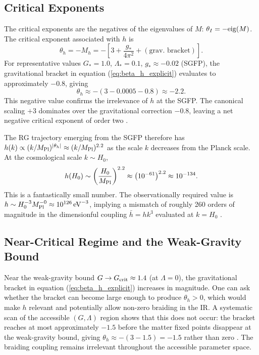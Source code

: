 \documentclass[12pt,a4paper]{article}
\begin{document}
\subsection{Critical Exponents}

The critical exponents are the negatives of the eigenvalues of $M$:
$\theta_I = -{\rm eig}(M)$. The critical exponent associated with $h$ is
\begin{equation}
\theta_h = -M_h = -\left[3 + \frac{g_*}{4\pi^2} + (\text{grav. bracket})\right].
\end{equation}
For representative values $G_* = 1.0$, $\Lambda_* = 0.1$, $g_* \approx -0.02$
(SGFP), the gravitational bracket in equation (\ref{eq:beta_h_explicit})
evaluates to approximately $-0.8$, giving
\begin{equation}
\theta_h \approx -(3 - 0.0005 - 0.8) \approx -2.2.
\end{equation}
This negative value confirms the irrelevance of $h$ at the SGFP. The canonical
scaling $+3$ dominates over the gravitational correction $-0.8$, leaving a net
negative critical exponent of order two \cite{EichhornLinoWagner2023}.

The RG trajectory emerging from the SGFP therefore has $h(k) \propto (k/M_{\rm Pl})^{|\theta_h|} \approx (k/M_{\rm Pl})^{2.2}$ as the scale $k$ decreases from the Planck scale. At the cosmological scale $k \sim H_0$,
\begin{equation}
h(H_0) \sim \left(\frac{H_0}{M_{\rm Pl}}\right)^{2.2}
\approx \left(10^{-61}\right)^{2.2}
\approx 10^{-134}.
\end{equation}
This is a fantastically small number. The observationally required value is
$h \sim H_0^{-3}M_{\rm Pl}^{-0} \approx 10^{126}\,{\rm eV}^{-3}$, implying a
mismatch of roughly 260 orders of magnitude in the dimensionful coupling
$\bar h = h k^3$ evaluated at $k = H_0$ \cite{EichhornLinoWagner2023}.

\subsection{Near-Critical Regime and the Weak-Gravity Bound}

Near the weak-gravity bound $G \to G_{\rm crit} \approx 1.4$ (at $\Lambda = 0$),
the gravitational bracket in equation (\ref{eq:beta_h_explicit}) increases in
magnitude. One can ask whether the bracket can become large enough to produce
$\theta_h > 0$, which would make $h$ relevant and potentially allow non-zero
braiding in the IR. A systematic scan of the accessible $(G,\Lambda)$ region
shows that this does not occur: the bracket reaches at most approximately
$-1.5$ before the matter fixed points disappear at the weak-gravity bound,
giving $\theta_h \approx -(3 - 1.5) = -1.5$ rather than zero
\cite{EichhornLinoWagner2023,EichhornSchiffer2022handbook}. The braiding
coupling remains irrelevant throughout the accessible parameter space.
\end{document}
